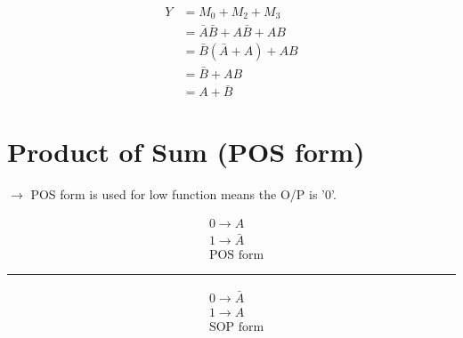 \documentclass[a4aper,12pt]{report}
\newcounter{questionbox}[chapter]
\begin{document}
 \vspace{10pt}
\begin{questionbox}[Simplify the expression for \ensuremath{Y=(A+B)=\sum (0,2,3)}]
    \begin{align*}
        Y &=M_0+M_2+M_3\\
          &=\bar{A}\bar{B}+A\bar{B}+AB\\
          &=\bar{B}(\bar{A}+A)+AB\\
          &=\bar{B}+AB\\
          &=A+\bar{B}
    \end{align*}
\end{questionbox}
\section{Product of Sum (POS form)}
$\rightarrow$ POS form is used for low function means the  O/P is '0'.\\
\begin{minipage}{.5\linewidth}
    \begin{align*}
        & 0\longrightarrow A\\
        & 1\longrightarrow \bar{A}\\
        & \text{POS form}
    \end{align*}
\end{minipage}
\begin{minipage}{0.05\linewidth}
        \rule{1pt}{2cm}
    \end{minipage}
    \begin{minipage}{.5\linewidth}
        \begin{align*}
            & 0 \longrightarrow \bar{A}\\
            & 1 \longrightarrow A\\
            & \text{SOP form}
        \end{align*}
        
    \end{minipage}
    \vspace{10pt}
\end{document}
